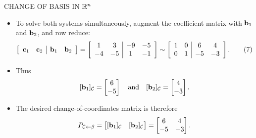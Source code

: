 \begin{frame}[shrink=10]{CHANGE OF BASIS IN $\mathbb{R}^n$}
\begin{itemize}
\item To solve both systems simultaneously, augment the coefficient matrix with $\mathbf{b}_1$ and $\mathbf{b}_2$, and row reduce:
\begin{equation*}
\left[\begin{array}{cc|cc}\mathbf{c}_1&\mathbf{c}_2&\mathbf{b}_1&\mathbf{b}_2\end{array}\right]=
\left[\begin{array}{cc|cc}1&3&-9&-5\\-4&-5&1&-1\end{array}\right]
\sim
\left[\begin{array}{cc|cc}1&0&6&4\\0&1&-5&-3\end{array}\right]. \tag{7}
\end{equation*}
\item Thus
\[
[\mathbf{b}_1]_{\mathcal C}=\begin{bmatrix}6\\-5\end{bmatrix}
\quad\text{and}\quad
[\mathbf{b}_2]_{\mathcal C}=\begin{bmatrix}4\\-3\end{bmatrix}.
\]
\item The desired change-of-coordinates matrix is therefore
\[
P_{\mathcal C\leftarrow\beta}=
\begin{bmatrix}[\mathbf{b}_1]_{\mathcal C}&[\mathbf{b}_2]_{\mathcal C}\end{bmatrix}
=\begin{bmatrix}6&4\\-5&-3\end{bmatrix}.
\]
\end{itemize}
\end{frame}
